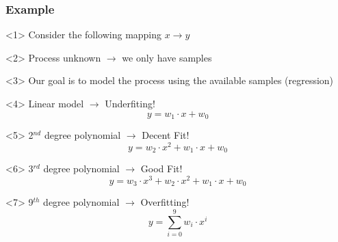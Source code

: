 \documentclass{beamer}
\begin{document}
\begin{frame}
  \frametitle{Example}
  \begin{onlyenv}<1>
    Consider the following mapping $x \rightarrow y$
    \begin{center}
      \scalebox{0.5}{
        
      }
    \end{center}
  \end{onlyenv}
  \begin{onlyenv}<2>
    Process unknown \(\rightarrow\) we only have samples
    \begin{center}
      \scalebox{0.5}{
        
      }
    \end{center}
  \end{onlyenv}
  \begin{onlyenv}<3>
    Our goal is to model the process using the available samples (regression)
    \vspace{1cm}\\
  \end{onlyenv}
  \begin{onlyenv}<4>
    Linear model \(\rightarrow\) Underfiting!
    \begin{equation*}
      y = w_1\cdot x + w_0
    \end{equation*}
    \begin{center}
      \scalebox{0.5}{
        
      }
    \end{center}
  \end{onlyenv}
  \begin{onlyenv}<5>
    2$^{nd}$ degree polynomial \(\rightarrow\) Decent Fit!
    \begin{equation*}
      y = w_2\cdot x^2 + w_1\cdot x + w_0
    \end{equation*}
    \begin{center}
      \scalebox{0.5}{
        
      }
    \end{center}
  \end{onlyenv}
  \begin{onlyenv}<6>
    3$^{rd}$ degree polynomial \(\rightarrow\) Good Fit!
    \begin{equation*}
      y = w_3\cdot x^3 + w_2\cdot x^2 + w_1\cdot x + w_0
    \end{equation*}
    \begin{center}
      \scalebox{0.5}{
        
      }
    \end{center}
  \end{onlyenv}
  \begin{onlyenv}<7>
    9$^{th}$ degree polynomial \(\rightarrow\) Overfitting!
    \begin{equation*}
      y = \sum_{i=0}^{9}w_i\cdot x^{i}
    \end{equation*}
    \begin{center}
      \scalebox{0.5}{
        
      }
    \end{center}
  \end{onlyenv}
\end{frame}
\end{document}
